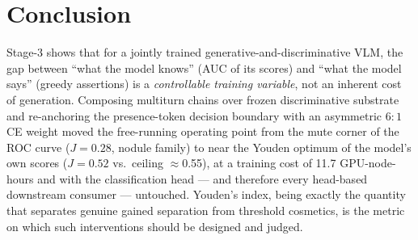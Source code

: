 \documentclass[10pt,a4paper]{article}
\begin{document}
\section{Conclusion}

Stage-3 shows that for a jointly trained generative-and-discriminative VLM, the gap
between ``what the model knows'' (AUC of its scores) and ``what the model says''
(greedy assertions) is a \emph{controllable training variable}, not an inherent cost of
generation. Composing multiturn chains over frozen discriminative substrate and
re-anchoring the presence-token decision boundary with an asymmetric $6{:}1$ CE weight
moved the free-running operating point from the mute corner of the ROC curve
($J{=}0.28$, nodule family) to near the Youden optimum of the model's own scores
($J{=}0.52$ vs.\ ceiling $\approx$0.55), at a training cost of 11.7 GPU-node-hours and
with the classification head --- and therefore every head-based downstream consumer ---
untouched. Youden's index, being exactly the quantity that separates genuine gained
separation from threshold cosmetics, is the metric on which such interventions should
be designed and judged.
\end{document}
